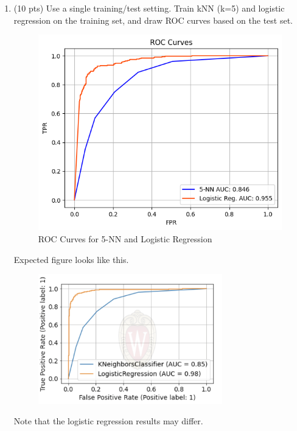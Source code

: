 \documentclass[a4paper]{article}
\theoremstyle{definition}
\newenvironment{soln}{
    \leavevmode\color{blue}\ignorespaces
}{}
\begin{document}
\begin{enumerate}
	\item (10 pts) Use a single training/test setting. Train kNN (k=5) and logistic regression on the training set, and draw ROC curves based on the test set. \\
        \begin{soln}
            \begin{figure}[H]
    		\centering
    		\includegraphics[scale=0.5]{Images/ROC_Final.png}
                \caption{ROC Curves for 5-NN and Logistic Regression}
                \label{fig:rocknnlr}
    	\end{figure}
        \end{soln}
	Expected figure looks like this.
	\begin{figure}[h]
		\centering
		\includegraphics[width=8cm]{Images/Original/roc.png}
	\end{figure}
	Note that the logistic regression results may differ.
	
	
	
\end{enumerate}

\end{document}
